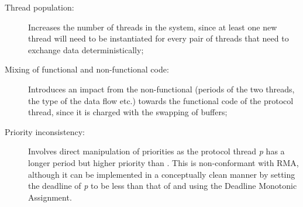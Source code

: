 \begin{description}
\item[Thread population:]{Increases the number of threads in the
  system, since at least one new thread will need to be instantiated
  for every pair of threads that need to exchange data
  deterministically;}
\item[Mixing of functional and non-functional code:]{Introduces an
  impact from the non-functional (periods of the two threads, the type
  of the data flow etc.) towards the functional code of the protocol
  thread, since it is charged with the swapping of buffers;}
\item[Priority inconsistency:]{Involves direct manipulation of
  priorities as the protocol thread \emph{p} has a longer period but
  higher priority than \ts. This is non-conformant with RMA, although
  it can be implemented in a conceptually clean manner by setting the
  deadline of \emph{p} to be less than that of \ts and using the
  Deadline Monotonic Assignment.}
\end{description}

